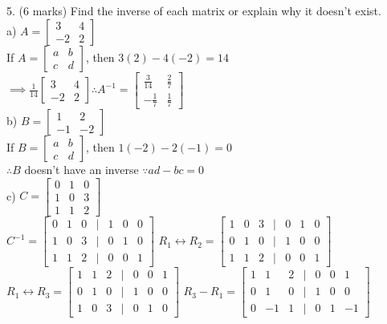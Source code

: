 \documentclass[a4paper]{article}
\begin{document}
5. (6 marks) Find the inverse of each matrix or explain why it doesn't exist.\\
a) $A = \begin{bmatrix}
3&4\\
-2&2
\end{bmatrix}$\\
If $A = \begin{bmatrix}
a&b\\
c&d
\end{bmatrix}$, then $3(2)-4(-2) = 14$\\
$\implies \frac{1}{14}\begin{bmatrix}
3&4\\
-2&2
\end{bmatrix} \therefore A^{-1} = \begin{bmatrix}
\frac{3}{14}&\frac{2}{7}\\
-\frac{1}{7}&\frac{1}{7}
\end{bmatrix}$\\
b) $B = \begin{bmatrix}
1&2\\
-1&-2
\end{bmatrix}$\\
If $B = \begin{bmatrix}
a&b\\
c&d
\end{bmatrix}$, then $1(-2)-2(-1) = 0$\\
$\therefore B$ doesn't have an inverse $\because ad - bc = 0$\\ 
c) $C = \begin{bmatrix}
0&1&0\\
1&0&3\\
1&1&2
\end{bmatrix}$\\
$C^{-1} = \begin{bmatrix}
0&1&0&|&1&0&0\\
1&0&3&|&0&1&0\\
1&1&2&|&0&0&1
\end{bmatrix}$ $R_1 \leftrightarrow R_2 = \begin{bmatrix}
1&0&3&|&0&1&0\\
0&1&0&|&1&0&0\\
1&1&2&|&0&0&1
\end{bmatrix}$\\
$R_1 \leftrightarrow R_3 = \begin{bmatrix}
1&1&2&|&0&0&1\\
0&1&0&|&1&0&0\\
1&0&3&|&0&1&0
\end{bmatrix}$ $R_3 - R_1 = \begin{bmatrix}
1&1&2&|&0&0&1\\
0&1&0&|&1&0&0\\
0&-1&1&|&0&1&-1
\end{bmatrix}$\\
\end{document}
